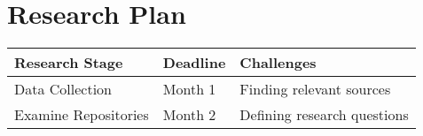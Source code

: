 \section{Research Plan}


\begin{table}[h]
  \centering
  \begin{adjustbox}{max width=\columnwidth}
  \begin{tabular}{|p{3.2cm}|p{2.6cm}|p{2.6cm}|}
      \hline
      \textbf{Research Stage} & \textbf{Deadline} & \textbf{Challenges} \\
      \hline
      Data Collection & Month 1 & Finding relevant sources \\
      \hline
      Examine Repositories & Month 2 & Defining research questions \\
      \hline

  \end{tabular}
  \end{adjustbox}
\end{table}